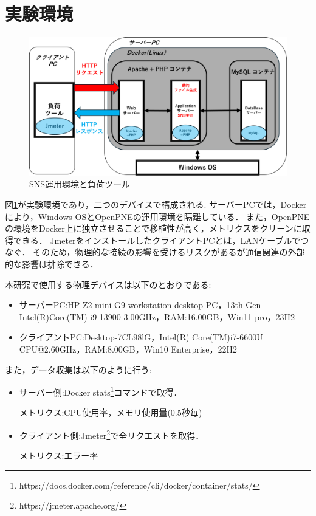 \documentclass[twoside,twocolumn,10pt]{jarticle}  %
\begin{document}
\section{実験環境}
\label{sec:environment}
\begin{figure}
  \centering
  \includegraphics[scale=0.29]{figures/SNS_Docker.png}
  \vspace{0.05cm}
  \caption{SNS運用環境と負荷ツール}
  \label{fig:1}
\end{figure}
図\ref{fig:1}が実験環境であり，二つのデバイスで構成される.
サーバーPCでは，Dockerにより，Windows OSとOpenPNEの運用環境を隔離している．
また，OpenPNEの環境をDocker上に独立させることで移植性が高く，メトリクスをクリーンに取得できる．
JmeterをインストールしたクライアントPCとは，LANケーブルでつなぐ．
そのため，物理的な接続の影響を受けるリスクがあるが通信関連の外部的な影響は排除できる．

本研究で使用する物理デバイスは以下のとおりである:
\begin{itemize}
  \setlength{\parskip}{0cm} %
  \setlength{\itemsep}{0cm} %
  \item サーバーPC:HP Z2 mini G9 workstation desktop PC，13th Gen Intel(R)Core(TM) i9-13900 3.00GHz，RAM:16.00GB，Win11 pro，23H2
  \item クライアントPC:Desktop-7CL98lG，Intel(R) Core(TM)i7-6600U CPU@2.60GHz，RAM:8.00GB，Win10 Enterprise，22H2
\end{itemize}
また，データ収集は以下のように行う:
\begin{itemize}
  \setlength{\parskip}{0cm} %
  \setlength{\itemsep}{0cm} %
  \item サーバー側:Docker stats\footnote{https://docs.docker.com/reference/cli/docker/container/stats/}コマンドで取得．\par
  メトリクス:CPU使用率，メモリ使用量(0.5秒毎)
  \item クライアント側:Jmeter\footnote{https://jmeter.apache.org/}で全リクエストを取得．\par
  メトリクス:エラー率
\end{itemize}
\end{document}
